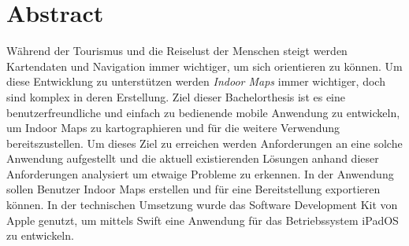 \chapter*{Abstract}
Während der Tourismus und die Reiselust der Menschen steigt werden Kartendaten und Navigation immer wichtiger, um sich orientieren zu können.
Um diese Entwicklung zu unterstützen werden \emph{Indoor Maps} immer wichtiger, doch sind komplex in deren Erstellung.\pbreak%
%
Ziel dieser Bachelorthesis ist es eine benutzerfreundliche und einfach zu bedienende mobile Anwendung zu entwickeln, um Indoor Maps zu kartographieren und für die weitere Verwendung bereitszustellen.
Um dieses Ziel zu erreichen werden Anforderungen an eine solche Anwendung aufgestellt und die aktuell existierenden Lösungen anhand dieser Anforderungen analysiert um etwaige Probleme zu erkennen.\pbreak%
%
In der Anwendung sollen Benutzer Indoor Maps erstellen und für eine Bereitstellung exportieren können.
In der technischen Umsetzung wurde das Software Development Kit von Apple genutzt, um mittels Swift eine Anwendung für das Betriebssystem iPadOS zu entwickeln.
\clearpage
